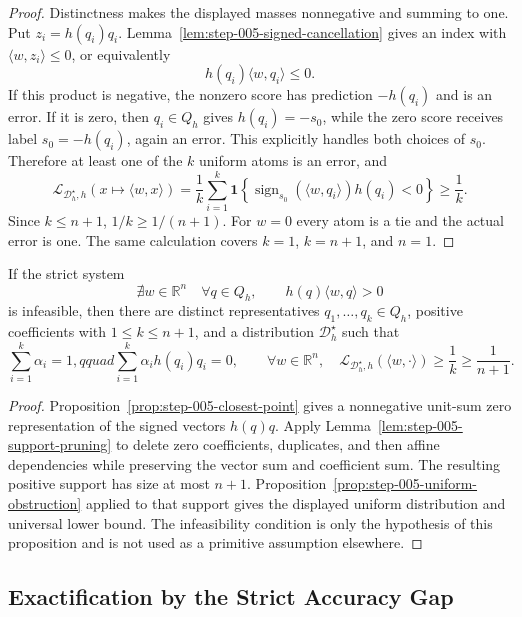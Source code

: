 \begin{proof}
Distinctness makes the displayed masses nonnegative and summing to one.  Put
$z_i=h(q_i)q_i$.  Lemma~\ref{lem:step-005-signed-cancellation} gives an
index with $\langle w,z_i\rangle\leq0$, or equivalently
\[
h(q_i)\langle w,q_i\rangle\leq0.
\]
If this product is negative, the nonzero score has prediction $-h(q_i)$ and
is an error.  If it is zero, then $q_i\in Q_h$ gives
$h(q_i)=-s_0$, while the zero score receives label $s_0=-h(q_i)$, again an
error.  This explicitly handles both choices of $s_0$.
Therefore at least one of the $k$ uniform atoms is an error, and
\[
\mathcal L_{\mathcal D_h^\star,h}(x\mapsto\langle w,x\rangle)
=\frac1k\sum_{i=1}^k
\mathbf 1\!\left\{
\operatorname{sign}_{s_0}(\langle w,q_i\rangle)h(q_i)<0
\right\}
\geq\frac1k.
\]
Since $k\leq n+1$, $1/k\geq1/(n+1)$.  For $w=0$ every atom is a tie and
the actual error is one.  The same calculation covers $k=1$, $k=n+1$, and
$n=1$.
\end{proof}

\begin{proposition}
\label{prop:step-005-obstruction}
If the strict system
\[
\nexists w\in\mathbb R^n\quad
\forall q\in Q_h,\qquad h(q)\langle w,q\rangle>0
\]
is infeasible, then there are distinct representatives
$q_1,\ldots,q_k\in Q_h$, positive coefficients with $1\leq k\leq n+1$,
and a distribution $\mathcal D_h^\star$ such that
\[
\sum_{i=1}^k\alpha_i=1,qquad
\sum_{i=1}^k\alpha_i h(q_i)q_i=0,
\qquad
\forall w\in\mathbb R^n,\quad
\mathcal L_{\mathcal D_h^\star,h}(\langle w,\cdot\rangle)
\geq\frac1k\geq\frac1{n+1}.
\]
\end{proposition}

\begin{proof}
Proposition~\ref{prop:step-005-closest-point} gives a nonnegative unit-sum
zero representation of the signed vectors $h(q)q$.  Apply
Lemma~\ref{lem:step-005-support-pruning} to delete zero coefficients,
duplicates, and then affine dependencies while preserving the vector sum and
coefficient sum.  The resulting positive support has size at most $n+1$.
Proposition~\ref{prop:step-005-uniform-obstruction} applied to that support
gives the displayed uniform distribution and universal lower bound.  The
infeasibility condition is only the hypothesis of this proposition and is not
used as a primitive assumption elsewhere.
\end{proof}

\subsection{Exactification by the Strict Accuracy Gap}
\label{app:exactification}

